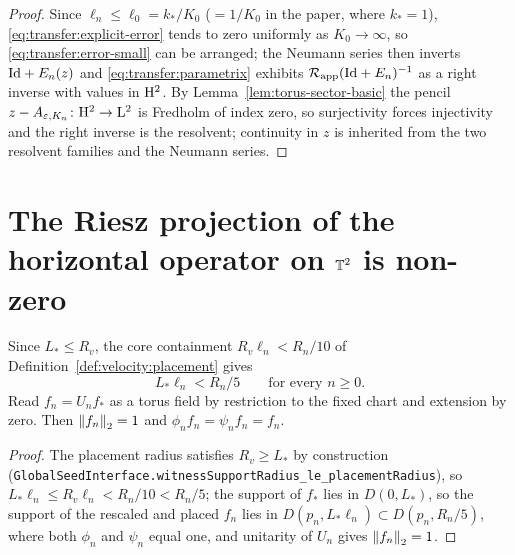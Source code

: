 \begin{proof}
  \leanok
  Since $\ell_n\leq\ell_0=k_*/K_0$ ($=1/K_0$ in the paper, where $k_*=1$),
  \eqref{eq:transfer:explicit-error} tends to zero
  uniformly as $K_0\to\infty$, so \eqref{eq:transfer:error-small} can be arranged; the
  Neumann series then inverts $\mathrm{Id}+E_n(z)$ and \eqref{eq:transfer:parametrix} exhibits
  $\mathcal{R}_{\rm app}(\mathrm{Id}+E_n)^{-1}$ as a right inverse with values in $\mathrm{H}^2$.  By
  Lemma~\ref{lem:torus-sector-basic} the pencil $z-A_{\varepsilon,K_n}\colon\mathrm{H}^2\to\mathrm{L}^2$ is
  Fredholm of index zero, so surjectivity forces injectivity and the right inverse is the
  resolvent; continuity in $z$ is inherited from the two resolvent families and the
  Neumann series.
\end{proof}

\section{The Riesz projection of the horizontal operator on $\mathbb{T}^2$ is non-zero}

\begin{lemma}
  \label{lem:transfer:witness}
  \leanok
  Since $L_*\leq R_v$, the core containment $R_v\ell_n<R_n/10$ of
  Definition~\ref{def:velocity:placement} gives
  \begin{equation}
    L_*\ell_n<R_n/5\qquad\text{for every }n\geq0 .
    \label{eq:transfer:scaled-witness-support}
  \end{equation}
  Read $f_n=U_nf_*$ as a torus field by restriction to the fixed chart and extension by
  zero.  Then $\left\|f_n\right\|_2=1$ and $\phi_nf_n=\psi_nf_n=f_n$.
\end{lemma}

\begin{proof}
  \leanok
  The placement radius satisfies $R_v\geq L_*$ by construction
  (\texttt{GlobalSeedInterface.witnessSupportRadius\_le\_placementRadius}), so
  $L_*\ell_n\leq R_v\ell_n<R_n/10<R_n/5$; the support of $f_*$ lies in $D(0,L_*)$, so the
  support of the rescaled and placed $f_n$ lies in $D(p_n,L_*\ell_n)\subset D(p_n,R_n/5)$,
  where both $\phi_n$ and $\psi_n$ equal one, and unitarity of $U_n$ gives $\left\|f_n\right\|_2=1$.
\end{proof}

